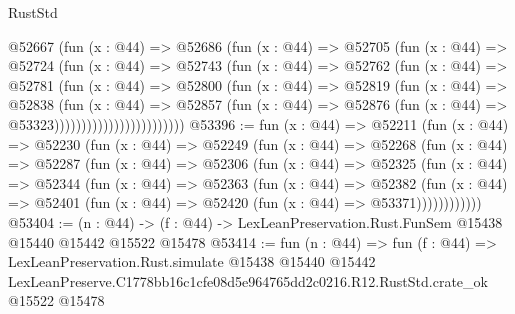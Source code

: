 \begin{lexlean}{RustStd}
\begin{coremodule}
                          @52667
                            (fun (x : @44) =>
                            @52686
                              (fun (x : @44) =>
                              @52705
                                (fun (x : @44) =>
                                @52724
                                  (fun (x : @44) =>
                                  @52743
                                    (fun (x : @44) =>
                                    @52762
                                      (fun (x : @44) =>
                                      @52781
                                        (fun (x : @44) =>
                                        @52800
                                          (fun (x : @44) =>
                                          @52819
                                            (fun (x : @44) =>
                                            @52838
                                              (fun (x : @44) =>
                                              @52857
                                                (fun (x : @44) =>
                                                @52876
                                                  (fun (x : @44) => @53323))))))))))))))))))))))))
@53396 := fun (x : @44) =>
  @52211
    (fun (x : @44) =>
    @52230
      (fun (x : @44) =>
      @52249
        (fun (x : @44) =>
        @52268
          (fun (x : @44) =>
          @52287
            (fun (x : @44) =>
            @52306
              (fun (x : @44) =>
              @52325
                (fun (x : @44) =>
                @52344
                  (fun (x : @44) =>
                  @52363
                    (fun (x : @44) =>
                    @52382
                      (fun (x : @44) =>
                      @52401 (fun (x : @44) => @52420 (fun (x : @44) => @53371))))))))))))
@53404 := (n : @44) ->
  (f : @44) -> LexLeanPreservation.Rust.FunSem @15438 @15440 @15442 @15522 @15478
@53414 := fun (n : @44) =>
  fun (f : @44) =>
  LexLeanPreservation.Rust.simulate
    @15438
    @15440
    @15442
    LexLeanPreserve.C1778bb16c1cfe08d5e964765dd2c0216.R12.RustStd.crate_ok
    @15522
    @15478
\end{coremodule}
\end{lexlean}
